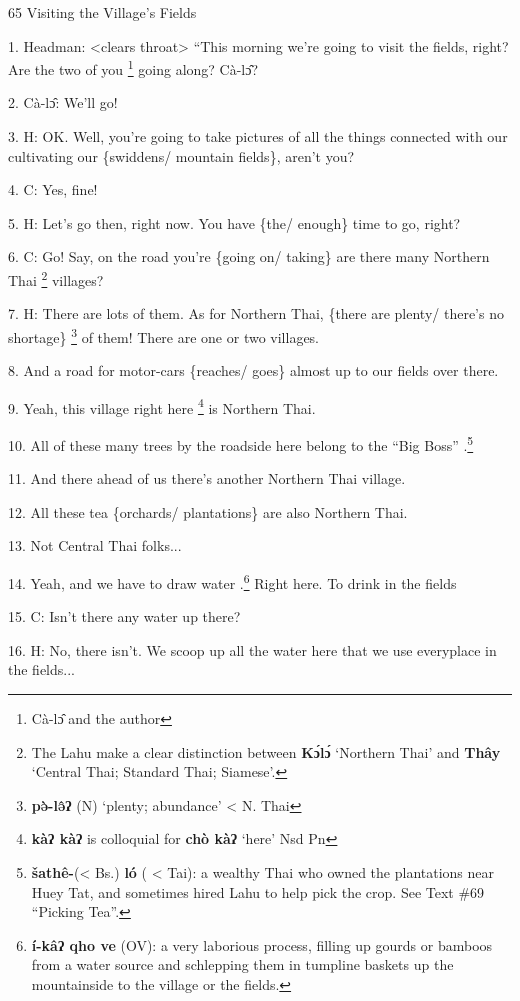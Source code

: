 
65 Visiting the Village's Fields

1. Headman: <clears throat> ``This morning we're going to visit
the fields, right? Are the two of you \footnote{Cà-lɔ̂ and the author} going along? Cà-lɔ̂?

2. Cà-lɔ̂: We'll go!

3. H: OK. Well, you're going to take pictures of all the things connected with
our cultivating our \{swiddens/ mountain fields\}, aren't you?

4. C: Yes, fine!

5. H: Let's go then, right now. You have \{the/ enough\} time to go, right?

6. C: Go! Say, on the road you're \{going on/ taking\} are there many Northern
Thai \footnote{The Lahu make a clear distinction between \textbf{Kɔ́lɔ́} `Northern Thai' and \textbf{Thây} `Central Thai; Standard Thai; Siamese'.} villages?

7. H: There are lots of them. As for Northern Thai, \{there are plenty/ there's
no shortage\} \footnote{\textbf{pə̀-lə̂ʔ} (N) `plenty; abundance' < N. Thai} of them! There are one or two villages.

8. And a road for motor-cars \{reaches/ goes\} almost up to our fields over there.

9. Yeah, this village right here \footnote{\textbf{ kàʔ kàʔ} is colloquial for\textbf{ chò kàʔ} `here'  Nsd Pn} is Northern Thai.

10. All of these many trees by the roadside here belong to the ``Big Boss'' .\footnote{\textbf{šathê-}(< Bs.) \textbf{ló} ( < Tai): a wealthy Thai who owned the plantations near Huey Tat, and sometimes hired Lahu to help pick the crop. See Text \#69 ``Picking Tea''.}

11. And there ahead of us there's another Northern Thai village.

12. All these tea \{orchards/ plantations\} are also Northern Thai.

13. Not Central Thai folks...

14. Yeah, and we have to draw water .\footnote{\textbf{ í-kâʔ qho ve} (OV): a very laborious process, filling up gourds or bamboos from a water source and schlepping them in tumpline baskets up the mountainside to the village or the fields.} Right here. To drink in the fields

15. C: Isn't there any water up there?

16. H: No, there isn't. We scoop up all the water here that we use everyplace in
the fields...

